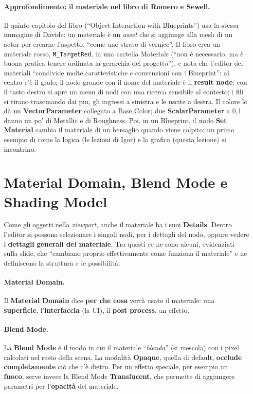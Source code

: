 \paragraph{Approfondimento: il materiale nel libro di Romero e Sewell.} Il quinto
capitolo del libro (``Object Interaction with Blueprints'') usa la stessa immagine di
Davide: un materiale è un \emph{asset} che si aggiunge alla mesh di un actor per
crearne l'aspetto, ``come uno strato di vernice''. Il libro crea un materiale rosso,
\texttt{M\_TargetRed}, in una cartella Materials (``non è necessario, ma è buona
pratica tenere ordinata la gerarchia del progetto''), e nota che l'editor dei
materiali ``condivide molte caratteristiche e convenzioni con i Blueprint'': al centro
c'è il grafo; il nodo grande con il nome del materiale è il \textbf{result node}; con il
tasto destro si apre un menu di nodi con una ricerca sensibile al contesto; i fili si
tirano trascinando dai pin, gli ingressi a sinistra e le uscite a destra. Il colore lo
dà un \textbf{VectorParameter} collegato a Base Color; due \textbf{ScalarParameter} a
0,1 danno un po' di Metallic e di Roughness. Poi, in un Blueprint, il nodo \textbf{Set
Material} cambia il materiale di un bersaglio quando viene colpito: un primo esempio di
come la logica (le lezioni di Igor) e la grafica (questa lezione) si incontrino.

\section{Material Domain, Blend Mode e Shading Model}
\label{ue3:sec:dettagli}

Come gli oggetti nella \emph{viewport}, anche il materiale ha i suoi
\textbf{Details}. Dentro l'editor si possono selezionare i singoli nodi, per i dettagli
del nodo, oppure vedere i \textbf{dettagli generali del materiale}. Tra questi ce ne
sono alcuni, evidenziati sulla slide, che ``cambiano proprio effettivamente come
funziona il materiale'' e ne definiscono la struttura e le possibilità.

\paragraph{Material Domain.} Il \textbf{Material Domain} dice \textbf{per che cosa}
verrà usato il materiale: una \textbf{superficie}, l'\textbf{interfaccia} (la UI), il
\textbf{post process}, un effetto.

\paragraph{Blend Mode.} La \textbf{Blend Mode} è il modo in cui il materiale
``\emph{blenda}'' (si mescola) con i pixel calcolati nel resto della scena. La modalità
\textbf{Opaque}, quella di default, \textbf{occlude completamente} ciò che c'è dietro.
Per un effetto speciale, per esempio un \textbf{fuoco}, serve invece la Blend Mode
\textbf{Translucent}, che permette di aggiungere parametri per l'\textbf{opacità} del
materiale.

